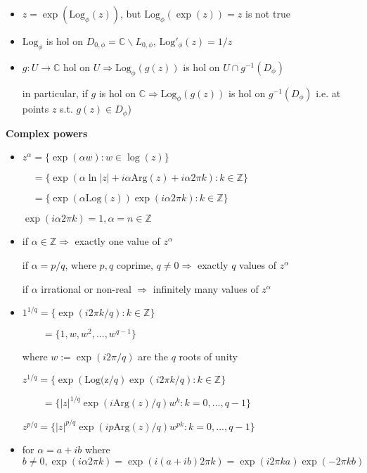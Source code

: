 \documentclass[10pt,a4paper]{article}
\begin{document}
\begin{multicols}{2}
\begin{itemize}
    \item $z=\exp(\text{Log}_\phi(z))$, but $\text{Log}_\phi(\exp(z))=z$ is not true
    \item $\text{Log}_\phi$ is hol on $D_{0,\phi}=\mathbb C \backslash L_{0,\phi}$, $\text{Log}'_\phi(z)=1/z$
    \item $g:U \rightarrow \mathbb C$ hol on $U \Rightarrow \text{Log}_\phi(g(z))$ is hol on $U \cap g^{-1}(D_\phi)$
      
      in particular, if $g$ is hol on $\mathbb C \Rightarrow \text{Log}_\phi(g(z))$ is hol on $g^{-1}(D_\phi)$ i.e. at points $z$ s.t. $g(z) \in D_\phi$)
\end{itemize}

\textbf{Complex powers}

\begin{itemize}
    \item $z^\alpha=\{ \exp(\alpha w): w \in \log(z) \}$ 
    
      $\quad =\{ \exp(\alpha\ln|z| + i \alpha \text{Arg}(z) + i\alpha2\pi k): k\in \mathbb Z \}$
    
      $\quad = \{ \exp(\alpha \text{Log}(z)) \exp(i\alpha 2 \pi k): k \in \mathbb Z \}$
  
      $\exp(i\alpha 2 \pi k)=1, \alpha=n \in \mathbb Z$
    
  \item if $\alpha\in\mathbb Z \Rightarrow$ exactly one value of $z^\alpha$
    
    if $\alpha=p/q$, where $p,q$ coprime, $q \neq 0 \Rightarrow$ exactly $q$ values of $z^\alpha$
  
    if $\alpha$ irrational or non-real $\Rightarrow$ infinitely many values of $z^\alpha$
  
  \item $1^{1/q}=\{\exp(i2\pi k/q): k\in\mathbb Z\}$
  
  $\qquad =\{1, w, w^2, ..., w^{q-1}\}$ 
  
  where $w := \exp(i2\pi/q)$ are the $q$ roots of unity
    
   $z^{1/q}=\{ \exp(\text{Log(z}/q) \exp(i2\pi k/q) : k\in\mathbb Z\}$
    
    $\qquad = \{ |z|^{1/q} \exp(i\text{Arg}(z)/q) w^k: k=0,...,q-1 \}$
  
   $z^{p/q}= \{ |z|^{p/q} \exp(ip \text{Arg}(z)/q) w^{pk}: k=0,...,q-1 \}$
  
  \item for $\alpha=a+ib$ where $b \neq 0, \exp(i\alpha2\pi k)=\exp(i(a+ib)2\pi k) = \exp(i2\pi ka)\exp(-2\pi kb)$
  

\end{itemize}
\end{multicols}
\end{document}
